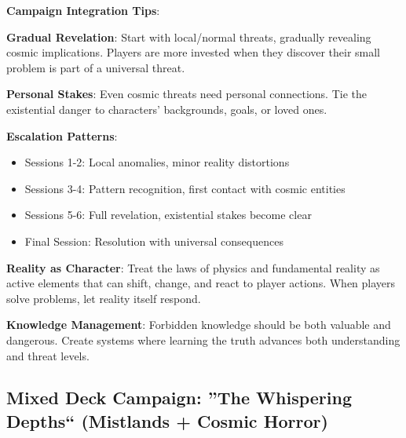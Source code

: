 \documentclass[11pt]{article}
\begin{document}
\begin{mdframed}[backgroundcolor=shadecolor]
\textbf{Campaign Integration Tips}:

\textbf{Gradual Revelation}:
Start with local/normal threats, gradually revealing cosmic implications. Players are more invested when they discover their small problem is part of a universal threat.

\textbf{Personal Stakes}:
Even cosmic threats need personal connections. Tie the existential danger to characters' backgrounds, goals, or loved ones.

\textbf{Escalation Patterns}:
\begin{itemize}[leftmargin=*]
\item Sessions 1-2: Local anomalies, minor reality distortions
\item Sessions 3-4: Pattern recognition, first contact with cosmic entities
\item Sessions 5-6: Full revelation, existential stakes become clear
\item Final Session: Resolution with universal consequences
\end{itemize}

\textbf{Reality as Character}:
Treat the laws of physics and fundamental reality as active elements that can shift, change, and react to player actions. When players solve problems, let reality itself respond.

\textbf{Knowledge Management}:
Forbidden knowledge should be both valuable and dangerous. Create systems where learning the truth advances both understanding and threat levels.
\end{mdframed}

\subsection*{Mixed Deck Campaign: ''The Whispering Depths`` (Mistlands + Cosmic Horror)}
\end{document}
